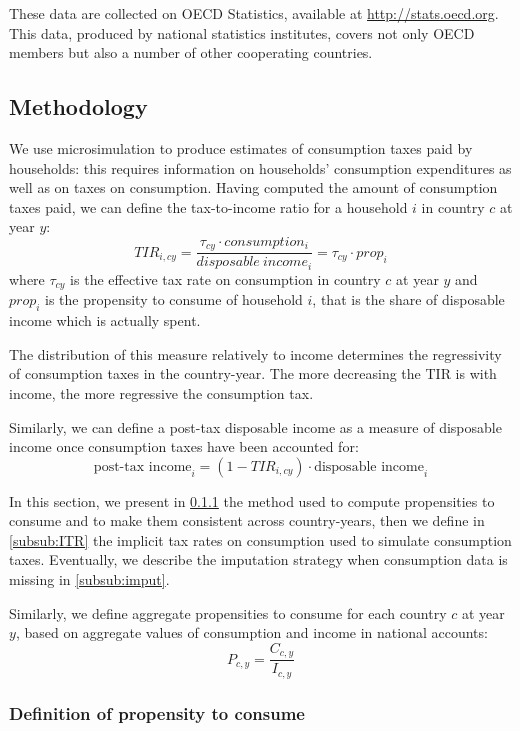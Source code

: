\documentclass[12pt]{article}
\begin{document}
These data are collected on OECD Statistics, available at \url{http://stats.oecd.org}. This data, produced by national statistics institutes, covers not only OECD members but also a number of other cooperating countries.


\subsection{Methodology}

We use microsimulation to produce estimates of consumption taxes paid by households: this requires information on households' consumption expenditures as well as on taxes on consumption. Having computed the amount of consumption taxes paid, we can define the tax-to-income ratio for a household $i$ in country $c$ at year $y$:
\begin{equation}
\label{eq:TIR}
TIR_{i,cy} = \frac{\tau_{cy} \cdot consumption_i}{disposable\ income_i} = \tau_{cy} \cdot prop_i 
\end{equation}
where $\tau_{cy}$ is the effective tax rate on consumption in country $c$ at year $y$ and $prop_i$ is the propensity to consume of household $i$, that is the share of disposable income which is actually spent. 

The distribution of this measure relatively to income determines the regressivity of consumption taxes in the country-year. The more decreasing the TIR is with income, the more regressive the consumption tax.

Similarly, we can define a post-tax disposable income as a measure of disposable income once consumption taxes have been accounted for:
\begin{equation}
\label{eq:posttax}
\text{post-tax income}_i = (1-TIR_{i,cy})\cdot \text{disposable income}_i
\end{equation}

In this section, we present in \ref{subsub:prop} the method used to compute propensities to consume and to make them consistent across country-years, then we define in \ref{subsub:ITR} the implicit tax rates on consumption used to simulate consumption taxes. Eventually, we describe the imputation strategy when consumption data is missing in \ref{subsub:imput}.

Similarly, we define aggregate propensities to consume for each country $c$ at year $y$, based on aggregate values of consumption and income in national accounts:
\[ P_{c,y} = \frac{C_{c,y}}{I_{c,y}} \]

\subsubsection{Definition of propensity to consume}
\label{subsub:prop}
\end{document}
